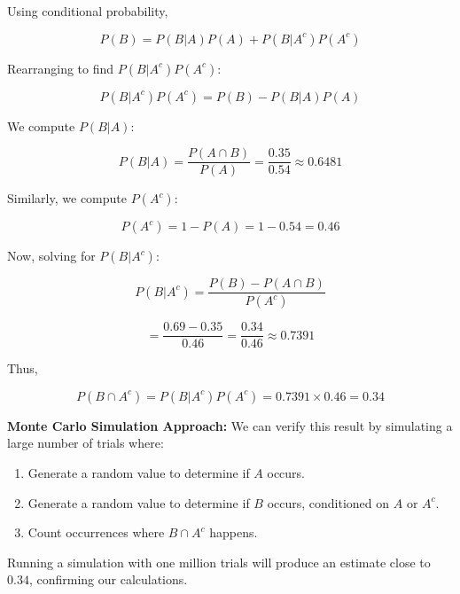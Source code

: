 \documentclass[journal]{IEEEtran}
\begin{document}
Using conditional probability,

\[
P(B) = P(B | A) P(A) + P(B | A^c) P(A^c)
\]

Rearranging to find \( P(B | A^c) P(A^c) \):

\[
P(B | A^c) P(A^c) = P(B) - P(B | A) P(A)
\]

We compute \( P(B | A) \):

\[
P(B | A) = \frac{P(A \cap B)}{P(A)} = \frac{0.35}{0.54} \approx 0.6481
\]

Similarly, we compute \( P(A^c) \):

\[
P(A^c) = 1 - P(A) = 1 - 0.54 = 0.46
\]

Now, solving for \( P(B | A^c) \):

\[
P(B | A^c) = \frac{P(B) - P(A \cap B)}{P(A^c)}
\]

\[
= \frac{0.69 - 0.35}{0.46} = \frac{0.34}{0.46} \approx 0.7391
\]

Thus,

\[
P(B \cap A^c) = P(B | A^c) P(A^c) = 0.7391 \times 0.46 = 0.34
\]

\textbf{Monte Carlo Simulation Approach:} We can verify this result by simulating a large number of trials where:
\begin{enumerate}
    \item Generate a random value to determine if \( A \) occurs.
    \item Generate a random value to determine if \( B \) occurs, conditioned on \( A \) or \( A^c \).
    \item Count occurrences where \( B \cap A^c \) happens.
\end{enumerate}

Running a simulation with one million trials will produce an estimate close to \( 0.34 \), confirming our calculations.
\end{document}
